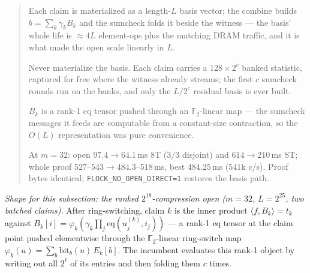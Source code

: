 \documentclass[11pt]{article}
\newcommand{\Ftwo}{\mathbb{F}_2}
\newcommand{\eq}{\mathrm{eq}}
\newcommand{\code}[1]{\texttt{#1}}
\newenvironment{optsummary}{%
  \begin{quote}\small
  \begin{description}
  \setlength{\itemsep}{1pt}\setlength{\parsep}{0pt}\setlength{\topsep}{2pt}
}{%
  \end{description}
  \end{quote}
}
\begin{document}
\begin{optsummary}
\item[Baseline:] Each claim is materialized as a length-$L$ basis vector; the combine builds $b=\sum_k \gamma_k B_k$ and the sumcheck folds it beside the witness --- the basis' whole life is $\approx4L$ element-ops plus the matching DRAM traffic, and it is what made the open scale linearly in $L$.
\item[Improvement:] Never materialize the basis. Each claim carries a $128\times2^c$ banked statistic, captured for free where the witness already streams; the first $c$ sumcheck rounds run on the banks, and only the $L/2^c$ residual basis is ever built.
\item[Mechanism:] $B_k$ is a rank-1 eq tensor pushed through an $\Ftwo$-linear map --- the sumcheck messages it feeds are computable from a constant-size contraction, so the $O(L)$ representation was pure convenience.
\item[Result:] At $m=32$: open $97.4\to64.1\,$ms 8T ($3/3$ disjoint) and $614\to210\,$ms ST; whole proof $527$--$543\to484.3$--$518\,$ms, best $484.25\,$ms ($541$k c/s). Proof bytes identical; \code{FLOCK\_NO\_OPEN\_DIRECT=1} restores the basis path.
\end{optsummary}

\emph{Shape for this subsection: the ranked $2^{18}$-compression open
($m=32$, $L=2^{25}$, two batched claims).} After ring-switching, claim $k$
is the inner product $\langle f, B_k\rangle = t_k$ against
$B_k[i] = \varphi_k\!\left(\gamma_k\prod_j \eq(u^{(k)}_j, i_j)\right)$ ---
a rank-1 eq tensor at the claim point pushed elementwise through the
$\Ftwo$-linear ring-switch map $\varphi_k(u) = \sum_b \mathrm{bit}_b(u)\,
E_k[b]$. The incumbent evaluates this rank-1 object by writing out all
$2^\ell$ of its entries and then folding them $c$ times.
\end{document}
